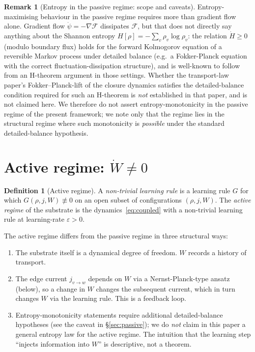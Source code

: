 \documentclass[11pt]{article}
\theoremstyle{definition}
\newtheorem{definition}[theorem]{Definition}
\newtheorem{remark}[theorem]{Remark}
\newcommand{\Fcal}{\mathcal{F}}
\begin{document}
\begin{remark}[Entropy in the passive regime: scope and caveats]
Entropy-maximising behaviour in the passive regime requires more than gradient flow alone. Gradient flow $\dot\psi = -\nabla\Fcal$ dissipates $\Fcal$, but that does not directly say anything about the Shannon entropy $H[\rho] = -\sum_v \rho_v \log\rho_v$: the relation $\dot H \geq 0$ (modulo boundary flux) holds for the forward Kolmogorov equation of a reversible Markov process under detailed balance (e.g.\ a Fokker-Planck equation with the correct fluctuation-dissipation structure), and is well-known to follow from an H-theorem argument in those settings. Whether the transport-law paper's Fokker--Planck-lift of the closure dynamics satisfies the detailed-balance condition required for such an H-theorem is \emph{not} established in that paper, and is not claimed here. We therefore do not assert entropy-monotonicity in the passive regime of the present framework; we note only that the regime lies in the structural regime where such monotonicity is \emph{possible} under the standard detailed-balance hypothesis.
\end{remark}

\section{Active regime: $\dot W \neq 0$}\label{sec:active}

\begin{definition}[Active regime]\label{def:active}
A \emph{non-trivial learning rule} is a learning rule $G$ for which $G(\rho, j, W) \not\equiv 0$ on an open subset of configurations $(\rho, j, W)$. The \emph{active regime} of the substrate is the dynamics~\eqref{eq:coupled} with a non-trivial learning rule at learning-rate $\varepsilon > 0$.
\end{definition}

The active regime differs from the passive regime in three structural ways:

\begin{enumerate}
    \item The substrate itself is a dynamical degree of freedom. $W$ records a history of transport.
    \item The edge current $j_{v \to w}$ depends on $W$ via a Nernst-Planck-type ansatz (below), so a change in $W$ changes the subsequent current, which in turn changes $W$ via the learning rule. This is a feedback loop.
    \item Entropy-monotonicity statements require additional detailed-balance hypotheses (see the caveat in \S\ref{sec:passive}); we do \emph{not} claim in this paper a general entropy law for the active regime. The intuition that the learning step ``injects information into $W$'' is descriptive, not a theorem.
\end{enumerate}
\end{document}
